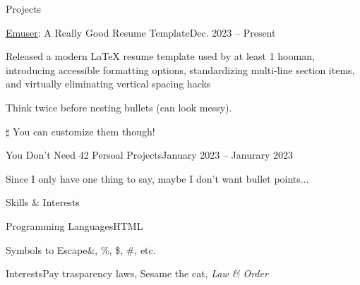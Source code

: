 \documentclass[9pt]{extarticle} %
\begin{document}
\begin{sectionList}{Projects}
    \item \lr
    {\href{https://github.com/quinnouyang/emuser}{Emuser}: A Really Good Resume Template}{Dec. 2023 -- Present}
    \begin{bullets}
        \item Released a modern LaTeX resume template used by at least 1 hooman, introducing accessible formatting options, standardizing multi-line section items, and virtually eliminating vertical spacing hacks
        \begin{bullets}[$\bullet$]
            \item Think twice before nesting bullets (can look messy).
            \item[$\sharp$] You can customize them though!
        \end{bullets}
    \end{bullets}

    \item \lr
    {You Don't Need 42 Persoal Projects}{January 2023 -- Janurary 2023}
    \begin{nobullets}
        \item Since I only have one thing to say, maybe I don't want bullet points...
    \end{nobullets}
\end{sectionList}

\begin{sectionList}{Skills \& Interests}
    \item \begin{nobullets}
        \item {}
        {Programming Languages}{HTML}
        \item {}
        {Symbols to Escape}{\&, \%, \$, \#, etc.}
        \item {}
        {Interests}{Pay trasparency laws, Sesame the cat, \textit{Law \& Order}}
    \end{nobullets}
\end{sectionList}

\dateFooter
\end{document}
